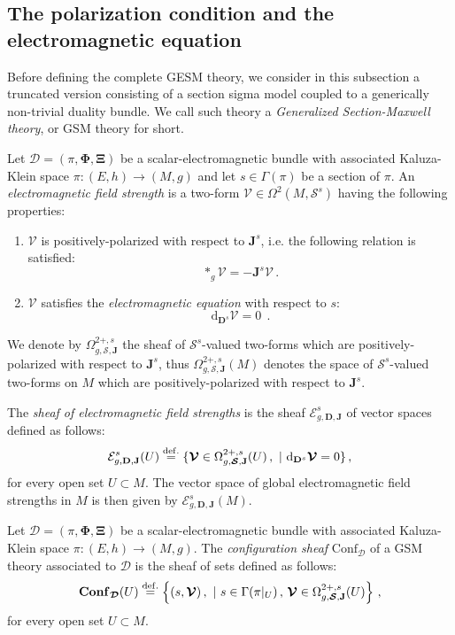 \documentclass[10pt, cmp, numbook, final, a4paper]{svjour}
\newcommand{\eqdef}{\stackrel{{\rm def.}}{=}}
\def\bD{\mathbb{D}}
\def\dd{\mathrm{d}}
\def\bcD{\boldsymbol{\mathcal{D}}}
\def\bJ{\mathbf{J}}
\def\bJ{\mathbf{J}}
\newcommand{\be}{\begin{equation*}}
\newcommand{\ee}{\end{equation*}}
\newcommand{\ben}{\begin{equation}}
\newcommand{\een}{\end{equation}}
\def\cE{\check{E}}
\def\bXi{{\boldsymbol{\Xi}}}
\def\cV{\mathcal{V}}
\def\cE{\mathcal{E}}
\def\bPhi{\mathbf{\Phi}}
\def\bConf{\mathbf{Conf}}
\def\bD{\mathbf{D}}
\def\Conf{\mathrm{Conf}}
\def\bcS{\boldsymbol{\mathcal{S}}}
\def\bD{\mathbf{D}}
\def\bcV{\boldsymbol{\cV}}
\begin{document}
\subsection{The polarization condition and the electromagnetic equation}

Before defining the complete GESM theory, we consider in this subsection
a truncated version consisting of a section sigma model coupled to a
generically non-trivial duality bundle. We call such theory a
{\em Generalized Section-Maxwell theory}, or GSM theory for short.

\begin{definition}
Let $\bcD=(\pi,\bPhi, \bXi)$ be a scalar-electromagnetic bundle
with associated Kaluza-Klein space $\pi\colon (E,h)\to
(M,g)$ and let $s\in \Gamma(\pi)$ be a section of $\pi$. An {\em
electromagnetic field strength} is a two-form
$\bcV\in \Omega^2(M,\bcS^s)$ having the following properties:
\begin{enumerate}[1.]
\itemsep 0.0em
\item $\bcV$ is positively-polarized with respect to $\bJ^s$, i.e. the
  following relation is satisfied:
\be
\ast_g \bcV=-\bJ^s\bcV\, .
\ee
\item $\bcV$ satisfies the {\em electromagnetic equation} with respect
  to $s$:
\ben
\label{GaugeEOM}
\dd_{\bD^s} \bcV=0~~.
\een
\end{enumerate} 
\end{definition}		
		
\noindent 
We denote by $\Omega^{2+,s}_{g,\bcS,\bJ}$ the sheaf of $\bcS^s$-valued
two-forms which are positively-polarized with respect to $\bJ^s$, thus
$\Omega^{2+,s}_{g,\bcS,\bJ}(M)$ denotes the space of $\bcS^s$-valued
two-forms on $M$ which are positively-polarized with respect to
$\bJ^s$.

\begin{definition}
The \emph{sheaf of electromagnetic field strengths} is the sheaf
$\cE_{g,\bD,\bJ}^s$ of vector spaces defined as follows:
\be
\cE_{g,\bD,\bJ}^s(U) \eqdef \{\bcV\in \Omega^{2+,s}_{g,\bcS,\bJ}(U)\, , \,\, | \,\, \dd_{\bD^s}\bcV=0\}\, ,
\ee
for every open set $U\subset M$. The vector space of global
electromagnetic field strengths in $M$ is then given by
$\cE_{g,\bD,\bJ}^s(M)$.
\end{definition}


\begin{definition}
Let $\bcD = (\pi,\bPhi,\bXi)$ be a scalar-electromagnetic bundle with
associated Kaluza-Klein space $\pi\colon (E,h)\to (M,g)$. The {\em
configuration sheaf} $\Conf_{\bcD}$ of a GSM theory associated to
$\bcD$ is the sheaf of sets defined as follows:
\be
\bConf_{\bcD}(U)\eqdef \left\{ (s,\bcV)\, , \,\, |\,\, s\in \Gamma(\pi|_{U}) \, , \, \bcV\in \Omega^{2+,s}_{g,\bcS,\bJ}(U) \right\}\, ,
\ee
for every open set $U\subset M$.
\end{definition}
\end{document}

